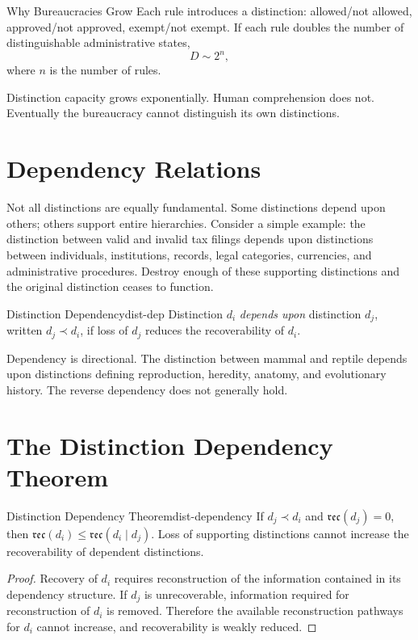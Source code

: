 \documentclass[12pt,twoside,openright]{book}
\newcommand{\reco}{\mathfrak{rec}}
\begin{document}
\begin{envelopeaside}{Why Bureaucracies Grow}
Each rule introduces a distinction: allowed/not allowed,
approved/not approved, exempt/not exempt. If each rule
doubles the number of distinguishable administrative states,
\[
  D \sim 2^n,
\]
where $n$ is the number of rules.

Distinction capacity grows exponentially. Human comprehension
does not. Eventually the bureaucracy cannot distinguish its
own distinctions.
\end{envelopeaside}

\section{Dependency Relations}
\label{sec:ch12-dependency}

Not all distinctions are equally fundamental. Some
distinctions depend upon others; others support entire
hierarchies. Consider a simple example: the distinction
between valid and invalid tax filings depends upon
distinctions between individuals, institutions, records,
legal categories, currencies, and administrative
procedures. Destroy enough of these supporting distinctions
and the original distinction ceases to function.

\begin{definition}{Distinction Dependency}{dist-dep}
  Distinction $d_i$ \emph{depends upon} distinction $d_j$,
  written $d_j \prec d_i$, if loss of $d_j$ reduces the
  recoverability of $d_i$.
\end{definition}

Dependency is directional. The distinction between mammal
and reptile depends upon distinctions defining
reproduction, heredity, anatomy, and evolutionary history.
The reverse dependency does not generally hold.

\section{The Distinction Dependency Theorem}
\label{sec:ch12-dependency-thm}

\begin{theorem}{Distinction Dependency Theorem}{dist-dependency}
  If $d_j \prec d_i$ and $\reco(d_j) = 0$, then
  $\reco(d_i) \le \reco(d_i \mid d_j)$. Loss of supporting
  distinctions cannot increase the recoverability of
  dependent distinctions.
\end{theorem}

\begin{proof}
  Recovery of $d_i$ requires reconstruction of the
  information contained in its dependency structure. If
  $d_j$ is unrecoverable, information required for
  reconstruction of $d_i$ is removed. Therefore the
  available reconstruction pathways for $d_i$ cannot
  increase, and recoverability is weakly reduced.
\end{proof}
\end{document}
